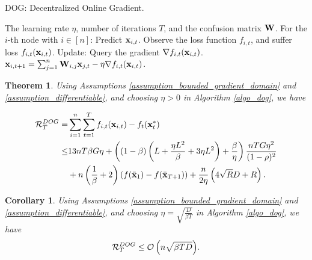 \documentclass{article}
\newtheorem{Theorem}{\bf{Theorem}}
\newtheorem{Corollary}{\bf{Corollary}}
\begin{document}
\newcommand\StateX{\Statex\hspace{\algorithmicindent}}
\begin{algorithm}[!]
   \caption{DOG: Decentralized Online Gradient.}
   \label{algo_dog}
   \begin{algorithmic}[1]
   \Require The learning rate $\eta$, number of iterations $T$, and the confusion matrix ${\bf W}$.
           \StateX For the $i$-th node with $i\in[n]$:
            \State \indent Predict ${\bf x}_{i,t}$.
            \State \indent Observe the loss function $f_{i,t}$,
            \StateX \indent and suffer loss $f_{i,t}({\bf x}_{i,t})$.
            \StateX Update:
            \State \indent Query the gradient $\nabla f_{i,t}({\bf x}_{i,t})$.  
            \State \indent ${\bf x}_{i,t+1} = \sum_{j=1}^n {\bf W}_{i,j}{\bf x}_{j,t} - \eta \nabla f_{i,t}({\bf x}_{i,t})$. 
       \EndFor
   \end{algorithmic}
\end{algorithm}










\begin{Theorem}
\label{theorem_regret_upper_bound}
Using Assumptions \ref{assumption_bounded_gradient_domain} and \ref{assumption_differentiable}, and choosing $\eta>0$ in Algorithm \ref{algo_dog}, we have

\begin{align}
\nonumber
{\mathcal{R}}_T^{DOG} = & \sum_{i=1}^n\sum_{t=1}^T f_{i,t}({\bf x}_{i,t}) - f_t({\bf x}_t^\ast) \\ \nonumber
\le & 13nT\beta G \eta + \left(  (1-\beta)  \left(  L + \frac{\eta L^2}{\beta} + 3\eta L^2  \right) + \frac{\beta}{\eta}  \right) \frac{nT G \eta^2}{(1-\rho)^2} \\ \nonumber 
&+ n\left( \frac{1}{\beta} + 2 \right)\left( f(\bar{{\bf x}}_1) - f(\bar{{\bf x}}_{T+1}) \right)   + \frac{n}{2\eta}\left(  4\sqrt{R}D + R   \right).
\end{align}


\end{Theorem}


\begin{Corollary}
Using Assumptions \ref{assumption_bounded_gradient_domain} and \ref{assumption_differentiable}, and choosing $\eta = \sqrt{\frac{D}{\beta T}}$ in Algorithm \ref{algo_dog}, we have
\begin{align}
\nonumber
{\mathcal{R}}_T^{DOG} \le {\mathcal{O}\left( n\sqrt{\beta TD} \right)}.
\end{align}




\end{Corollary}
\end{document}
